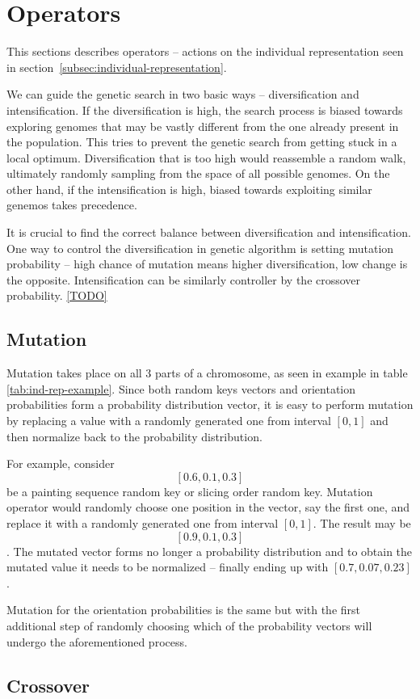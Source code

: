 

\section{Operators}\label{sec:operators}
This sections describes operators – actions on the individual representation
seen in section~\ref{subsec:individual-representation}.

We can guide the genetic search in two basic ways – diversification and intensification.
If the diversification is high, the search process is biased towards exploring genomes
that may be vastly different from the one already present in the population.
This tries to prevent the genetic search from getting stuck in a local optimum.
Diversification that is too high would reassemble a random walk, ultimately randomly sampling
from the space of all possible genomes. On the other hand, if the intensification is high,
biased towards exploiting similar genemos takes precedence.

It is crucial to find the correct balance between diversification and intensification.
One way to control the diversification in genetic algorithm is setting
mutation probability – high chance of mutation means higher diversification, low change is the opposite.
Intensification can be similarly controller by the crossover probability.
\ref{TODO}

\subsection{Mutation}\label{subsec:mutation}
Mutation takes place on all 3 parts of a chromosome, as seen in example in table \ref{tab:ind-rep-example}.
Since both random keys vectors and orientation probabilities form a probability distribution vector,
it is easy to perform mutation by replacing a value with a randomly generated one from interval $[0,1]$
and then normalize back to the probability distribution.

For example, consider $$[0.6, 0.1, 0.3]$$ be a painting sequence random key or slicing order random key.
Mutation operator would randomly choose one position in the vector, say the first one, and replace it
with a randomly generated one from interval $[0,1]$. The result may be $$[0.9, 0.1, 0.3]$$.
The mutated vector forms no longer a probability distribution and to obtain the mutated value
it needs to be normalized – finally ending up with $[0.7, 0.07, 0.23]$.

Mutation for the orientation probabilities is the same but with the first additional
step of randomly choosing which of the probability vectors will undergo the aforementioned process.

\subsection{Crossover}\label{subsec:crossover}


